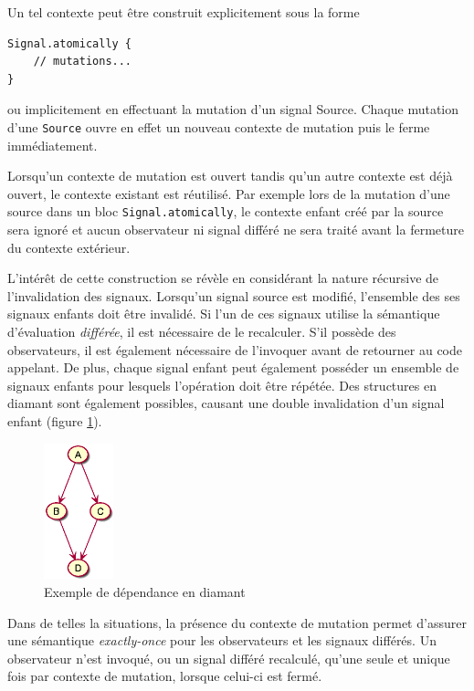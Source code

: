 Un tel contexte peut être construit explicitement sous la forme
\begin{lstlisting}
Signal.atomically {
	// mutations...
}
\end{lstlisting}
ou implicitement en effectuant la mutation d'un signal Source. Chaque mutation d'une \texttt{Source} ouvre en effet un nouveau contexte de mutation puis le ferme immédiatement.

Lorsqu'un contexte de mutation est ouvert tandis qu'un autre contexte est déjà ouvert, le contexte existant est réutilisé. Par exemple lors de la mutation d'une source dans un bloc \texttt{Signal.atomically}, le contexte enfant créé par la source sera ignoré et aucun observateur ni signal différé ne sera traité avant la fermeture du contexte extérieur.

L'intérêt de cette construction se révèle en considérant la nature récursive de l'invalidation des signaux. Lorsqu'un signal source est modifié, l'ensemble des ses signaux enfants doit être invalidé. Si l'un de ces signaux utilise la sémantique d'évaluation \emph{différée}, il est nécessaire de le recalculer. S'il possède des observateurs, il est également nécessaire de l'invoquer avant de retourner au code appelant. De plus, chaque signal enfant peut également posséder un ensemble de signaux enfants pour lesquels l'opération doit être répétée. Des structures en diamant sont également possibles, causant une double invalidation d'un signal enfant (figure \ref{fig:sig-diamond-dependencies}).

\begin{figure}[h]
	\centering
	\includegraphics[width=2cm]{img/signals_diamond}
	\caption{Exemple de dépendance en diamant}
	\label{fig:sig-diamond-dependencies}	
\end{figure}

Dans de telles la situations, la présence du contexte de mutation permet d'assurer une sémantique \emph{exactly-once} pour les observateurs et les signaux différés. Un observateur n'est invoqué, ou un signal différé recalculé, qu'une seule et unique fois par contexte de mutation, lorsque celui-ci est fermé.

